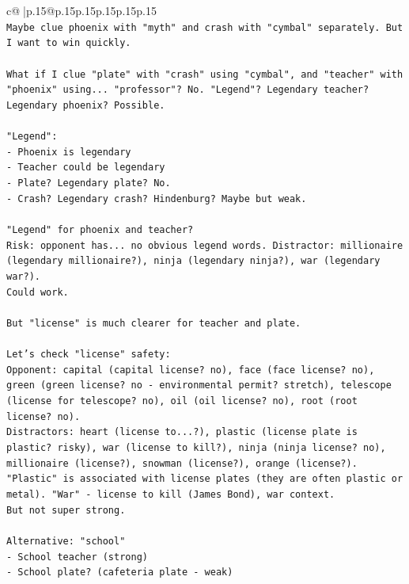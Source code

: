 \documentclass{article}
\begin{document}
{\begin{supertabular}{c@{$\;$}|p{.15\linewidth}@{}p{.15\linewidth}p{.15\linewidth}p{.15\linewidth}p{.15\linewidth}p{.15\linewidth}}
{{{\\ 
\texttt{Maybe clue phoenix with "myth" and crash with "cymbal" separately. But I want to win quickly.} \\
\\ 
\texttt{What if I clue "plate" with "crash" using "cymbal", and "teacher" with "phoenix" using... "professor"? No. "Legend"? Legendary teacher? Legendary phoenix? Possible.} \\
\\ 
\texttt{"Legend":} \\
\texttt{{-} Phoenix is legendary} \\
\texttt{{-} Teacher could be legendary} \\
\texttt{{-} Plate? Legendary plate? No.} \\
\texttt{{-} Crash? Legendary crash? Hindenburg? Maybe but weak.} \\
\\ 
\texttt{"Legend" for phoenix and teacher?} \\
\texttt{Risk: opponent has... no obvious legend words. Distractor: millionaire (legendary millionaire?), ninja (legendary ninja?), war (legendary war?).} \\
\texttt{Could work.} \\
\\ 
\texttt{But "license" is much clearer for teacher and plate.} \\
\\ 
\texttt{Let's check "license" safety:} \\
\texttt{Opponent: capital (capital license? no), face (face license? no), green (green license? no {-} environmental permit? stretch), telescope (license for telescope? no), oil (oil license? no), root (root license? no).} \\
\texttt{Distractors: heart (license to...?), plastic (license plate is plastic? risky), war (license to kill?), ninja (ninja license? no), millionaire (license?), snowman (license?), orange (license?).} \\
\texttt{"Plastic" is associated with license plates (they are often plastic or metal). "War" {-} license to kill (James Bond), war context.} \\
\texttt{But not super strong.} \\
\\ 
\texttt{Alternative: "school"} \\
\texttt{{-} School teacher (strong)} \\
\texttt{{-} School plate? (cafeteria plate {-} weak)} \\
}}}
\end{supertabular}}
\end{document}

